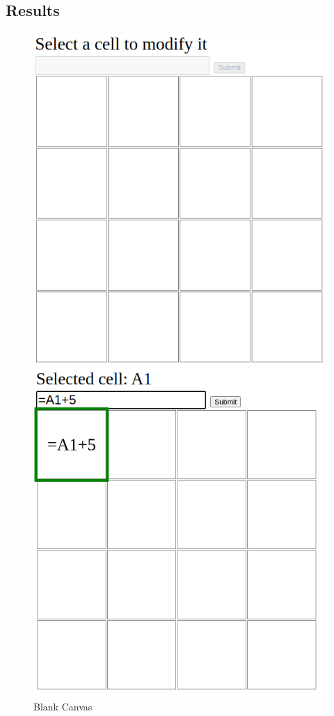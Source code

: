 \documentclass[12pt, a4paper]{article}
\begin{document}
  \subsection{Results}
  \begin{figure}[H]
    \centering
    \begin{minipage}{.5\textwidth}
      \centering
      \includegraphics[scale=0.3]{spreadsheet-empty.png}
      \caption{Blank Canvas}
    \end{minipage}%
    \begin{minipage}{.5\textwidth}
      \centering
      \includegraphics[scale=0.3]{spreadsheet-selected.png}

\end{minipage}
\end{figure}
\end{document}
